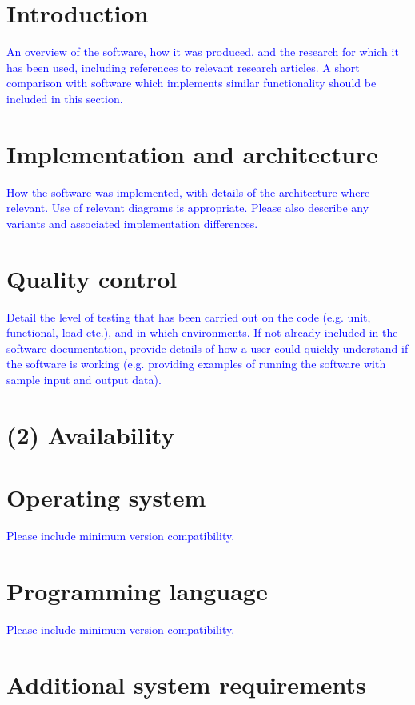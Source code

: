 \documentclass{jors}
\begin{document}
\section*{Introduction}

\textcolor{blue}{An overview of the software, how it was produced, and the research for which it has been used, including references to relevant research articles. A short comparison with software which implements similar functionality should be included in this section. }

\section*{Implementation and architecture}

\textcolor{blue}{How the software was implemented, with details of the architecture where relevant. Use of relevant diagrams is appropriate. Please also describe any variants and associated implementation differences.}


\section*{Quality control}

\textcolor{blue}{Detail the level of testing that has been carried out on the code (e.g. unit, functional, load etc.), and in which environments. If not already included in the software documentation, provide details of how a user could quickly understand if the software is working (e.g. providing examples of running the software with sample input and output data). }

\section*{(2) Availability}
\vspace{0.5cm}
\section*{Operating system}

\textcolor{blue}{Please include minimum version compatibility.}

\section*{Programming language}

\textcolor{blue}{Please include minimum version compatibility.}

\section*{Additional system requirements}
\end{document}

